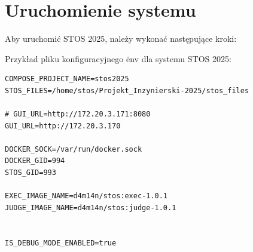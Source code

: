 \documentclass[12pt,a4paper]{article}
\begin{document}
\newpage
\section{Uruchomienie systemu}
Aby uruchomić STOS 2025, należy wykonać następujące kroki:


Przykład pliku konfiguracyjnego \.env dla systemu STOS 2025:
\begin{lstlisting}[style=envstyle]
COMPOSE_PROJECT_NAME=stos2025
STOS_FILES=/home/stos/Projekt_Inzynierski-2025/stos_files

# GUI_URL=http://172.20.3.171:8080
GUI_URL=http://172.20.3.170 

DOCKER_SOCK=/var/run/docker.sock
DOCKER_GID=994
STOS_GID=993

EXEC_IMAGE_NAME=d4m14n/stos:exec-1.0.1
JUDGE_IMAGE_NAME=d4m14n/stos:judge-1.0.1


IS_DEBUG_MODE_ENABLED=true
\end{lstlisting}

\end{document}
